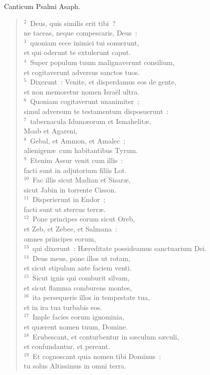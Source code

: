 \bchapter
\lettrine[lines=3,image=true,loversize=0.05,lraise=-0.03]{C}{}anticum Psalmi Asaph.
\begin{flushleft}\begin{verse}\vspace{6pt}${}^{2}$~Deus, quis similis erit tibi~?\\ ne taceas, neque compescaris, Deus~:\\
${}^{3}$~quoniam ecce inimici tui sonuerunt,\\ et qui oderunt te extulerunt caput.\\
${}^{4}$~Super populum tuum malignaverunt consilium,\\ et cogitaverunt adversus sanctos tuos.\\
${}^{5}$~Dixerunt~: Venite, et disperdamus eos de gente,\\ et non memoretur nomen Isra\"el ultra.\\
${}^{6}$~Quoniam cogitaverunt unanimiter~;\\ simul adversum te testamentum disposuerunt~:\\
${}^{7}$~tabernacula Idum\ae orum et Ismahelit\ae ,\\ Moab et Agareni,\\
${}^{8}$~Gebal, et Ammon, et Amalec~;\\ alienigen\ae\ cum habitantibus Tyrum.\\
${}^{9}$~Etenim Assur venit cum illis~:\\ facti sunt in adjutorium filiis Lot.\\
${}^{10}$~Fac illis sicut Madian et Sisar\ae ,\\ sicut Jabin in torrente Cisson.\\
${}^{11}$~Disperierunt in Endor~;\\ facti sunt ut stercus terr\ae .\\
${}^{12}$~Pone principes eorum sicut Oreb,\\ et Zeb, et Zebee, et Salmana~:\\ omnes principes eorum,\\
${}^{13}$~qui dixerunt~: H\ae reditate possideamus sanctuarium Dei.\\
${}^{14}$~Deus meus, pone illos ut rotam,\\ et sicut stipulam ante faciem venti.\\
${}^{15}$~Sicut ignis qui comburit silvam,\\ et sicut flamma comburens montes,\\
${}^{16}$~ita persequeris illos in tempestate tua,\\ et in ira tua turbabis eos.\\
${}^{17}$~Imple facies eorum ignominia,\\ et qu\ae rent nomen tuum, Domine.\\
${}^{18}$~Erubescant, et conturbentur in s\ae culum s\ae culi,\\ et confundantur, et pereant.\\
${}^{19}$~Et cognoscant quia nomen tibi Dominus~:\\ tu solus Altissimus in omni terra.\end{verse}\end{flushleft}



